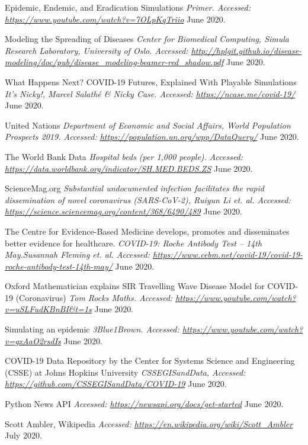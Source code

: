 \begin{thebibliography}{1}
 Epidemic, Endemic, and Eradication Simulations {\em Primer. Accessed:  \url{https://www.youtube.com/watch?v=7OLpKqTriio}} June 2020.

 Modeling the Spreading of Diseases {\em Center for Biomedical Computing, Simula Research Laboratory, University of Oslo. Accessed:  \url{http://hplgit.github.io/disease-modeling/doc/pub/disease_modeling-beamer-red_shadow.pdf}} June 2020.

 What Happens Next? COVID-19 Futures, Explained With Playable Simulations {\em It's Nicky!, Marcel Salathé & Nicky Case. Accessed:  \url{https://ncase.me/covid-19/}} June 2020.

 United Nations {\em Department of Economic and Social Affairs, World Population Prospects 2019. Accessed:  \url{https://population.un.org/wpp/DataQuery/}} June 2020.

 The World Bank Data {\em Hospital beds (per 1,000 people). Accessed:  \url{https://data.worldbank.org/indicator/SH.MED.BEDS.ZS}} June 2020.

 ScienceMag.org {\em Substantial undocumented infection facilitates the rapid dissemination of novel coronavirus (SARS-CoV-2), Ruiyun Li et. al. Accessed:  \url{https://science.sciencemag.org/content/368/6490/489}} June 2020.

 The Centre for Evidence-Based Medicine develops, promotes and disseminates better evidence for healthcare. {\em COVID-19: Roche Antibody Test – 14th May.Susannah Fleming et. al. Accessed:  \url{https://www.cebm.net/covid-19/covid-19-roche-antibody-test-14th-may/}} June 2020.

 Oxford Mathematician explains SIR Travelling Wave Disease Model for COVID-19 (Coronavirus) {\em Tom Rocks Maths. Accessed:  \url{https://www.youtube.com/watch?v=uSLFudKBnBI&t=1s}} June 2020.

 Simulating an epidemic {\em 3Blue1Brown. Accessed:  \url{https://www.youtube.com/watch?v=gxAaO2rsdIs}} June 2020.

 COVID-19 Data Repository by the Center for Systems Science and Engineering (CSSE) at Johns Hopkins University {\em CSSEGISandData, Accessed:  \url{https://github.com/CSSEGISandData/COVID-19}} June 2020.

 Python News API {\em Accessed:  \url{https://newsapi.org/docs/get-started}} June 2020.

 Scott Ambler, Wikipedia {\em Accessed:  \url{https://en.wikipedia.org/wiki/Scott_Ambler}} July 2020.


\end{thebibliography}
